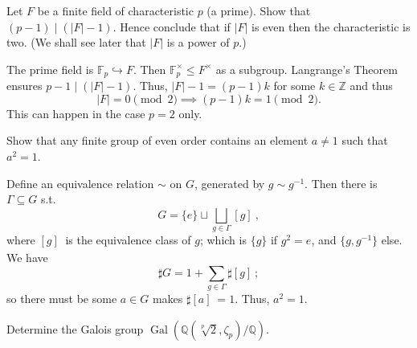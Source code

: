 \setcounter{pb}{21}
\begin{problem}
Let $F$ be a finite field of characteristic $p$ (a prime). Show that $(p - 1) \mid (|F| - 1)$. Hence conclude that if $|F|$ is even then the characteristic is two. (We shall see later that $|F|$ is a power of $p$.)
\end{problem}

\begin{solution}
    The prime field is $\mathbb{F}_{p}\hookrightarrow F$. Then $\mathbb{F}_{p}^{\times}\leq F^{\times}$ as a subgroup. Langrange's Theorem ensures $p-1\mid(|F|-1)$. 
    Thus, $|F|-1=(p-1)k$ for some $k\in\mathbb{Z}$ and thus 
        \[
            |F|=0\pmod 2\implies (p-1)k=1\pmod2.
        \]
    This can happen in the case $p=2$ only.
\end{solution}


    

\setcounter{pb}{22}
\begin{problem}
Show that any finite group of even order contains an element $a \neq 1$ such that $a^2 = 1$.
\end{problem}

\begin{solution}
    Define an equivalence relation $\sim$ on $G$, generated by $g\sim g^{-1}$. Then there is $\Gamma \subseteq G$ s.t.
        \[
            G=\{e\}\sqcup \bigsqcup_{g\in \Gamma}[g]_{~},
        \]
    where $[g]_{~}$ is the equivalence class of $g$; which is $\{g\}$ if $g^{2}=e$, and $\{g, g^{-1}\}$ else. 
    We have 
        \[
            \sharp G=1+\sum_{g\in\Gamma}\sharp[g]_{~};
        \]
    so there must be some $a\in G$ makes $\sharp[a]_{~}=1$. Thus, $a^{2}=1$.
\end{solution}

\setcounter{pb}{26}
\begin{problem}
    Determine the Galois group $ \operatorname{Gal}(\mathbb{Q}(\sqrt[p]{2}, \zeta_p)/\mathbb{Q}) $.
\end{problem}


